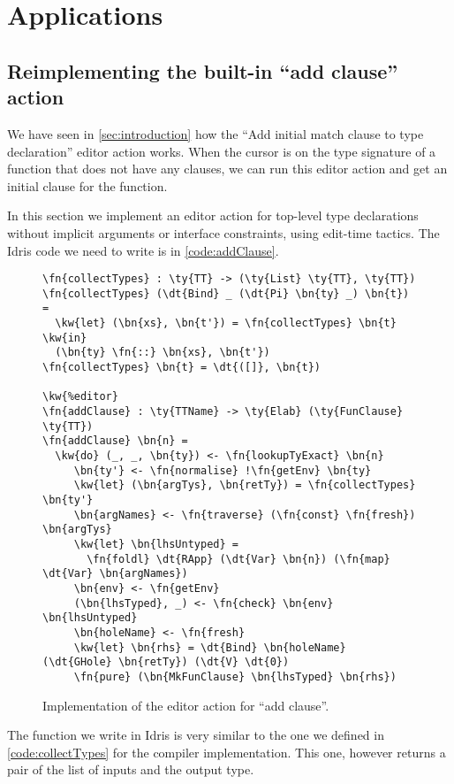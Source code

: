 \section{Applications} \label{sec:applications}

\subsection{Reimplementing the built-in ``add clause'' action}\label{sec:addClause}

We have seen in \autoref{sec:introduction} how the ``Add initial match clause
to type declaration'' editor action works. When the cursor is on the type
signature of a function that does not have any clauses, we can run this editor
action and get an initial clause for the function.

In this section we implement an editor action for top-level type declarations
without implicit arguments or interface constraints, using edit-time tactics.
The Idris code we need to write is in \autoref{code:addClause}.

\begin{figure}[ht]
\begin{Verbatim}[framesep=2mm, label=\footnotesize{\normalfont{Idris}}, labelposition=topline]
\fn{collectTypes} : \ty{TT} -> (\ty{List} \ty{TT}, \ty{TT})
\fn{collectTypes} (\dt{Bind} _ (\dt{Pi} \bn{ty} _) \bn{t}) =
  \kw{let} (\bn{xs}, \bn{t'}) = \fn{collectTypes} \bn{t} \kw{in}
  (\bn{ty} \fn{::} \bn{xs}, \bn{t'})
\fn{collectTypes} \bn{t} = \dt{([]}, \bn{t})

\kw{%editor}
\fn{addClause} : \ty{TTName} -> \ty{Elab} (\ty{FunClause} \ty{TT})
\fn{addClause} \bn{n} =
  \kw{do} (_, _, \bn{ty}) <- \fn{lookupTyExact} \bn{n}
     \bn{ty'} <- \fn{normalise} !\fn{getEnv} \bn{ty}
     \kw{let} (\bn{argTys}, \bn{retTy}) = \fn{collectTypes} \bn{ty'}
     \bn{argNames} <- \fn{traverse} (\fn{const} \fn{fresh}) \bn{argTys}
     \kw{let} \bn{lhsUntyped} =
       \fn{foldl} \dt{RApp} (\dt{Var} \bn{n}) (\fn{map} \dt{Var} \bn{argNames})
     \bn{env} <- \fn{getEnv}
     (\bn{lhsTyped}, _) <- \fn{check} \bn{env} \bn{lhsUntyped}
     \bn{holeName} <- \fn{fresh}
     \kw{let} \bn{rhs} = \dt{Bind} \bn{holeName} (\dt{GHole} \bn{retTy}) (\dt{V} \dt{0})
     \fn{pure} (\bn{MkFunClause} \bn{lhsTyped} \bn{rhs})
\end{Verbatim}
\caption{Implementation of the editor action for ``add clause''.}
\label{code:addClause}
\end{figure}

The  function we write in Idris is very similar to the one we
defined in \autoref{code:collectTypes} for the compiler implementation. 
This one, however returns a pair of the list of inputs and the output type.


